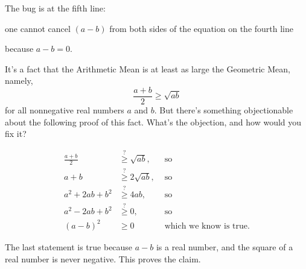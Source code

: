 \documentclass[handout]{mcs}
\begin{document}
\begin{problem}
\begin{solution}
The bug is at the fifth line:
\iffalse~(\ref{bug})\fi
one cannot cancel $(a-b)$ from
both sides of the equation on the fourth line
\iffalse~(\ref{cancel})\fi
because $a-b = 0$.
\end{solution}

\eparts
\end{problem}

\instatements{\newpage}

\begin{problem} It's a fact that the Arithmetic Mean is at least as
large the Geometric Mean, namely,
\[
\frac{a + b}{2} \geq \sqrt{a b}
\]
for all nonnegative real numbers $a$ and $b$.  But there's something
objectionable about the following proof of this fact.  What's the
objection, and how would you fix it?

\begin{bogusproof}
\begin{align*}
\frac{a + b}{2} & \stackrel{?}{\geq} \sqrt{a b}, & \text{ so} \\
a + b  & \stackrel{?}{\geq} 2 \sqrt{a b}, & \text{ so} \\
a^2 + 2 a b + b^2  & \stackrel{?}{\geq} 4 a b, & \text{ so}\\
a^2 - 2 a b + b^2  & \stackrel{?}{\geq} 0, & \text{ so}\\
(a - b)^2  & \geq 0 & \text{ which we know is true.}
\end{align*}

The last statement is true because $a - b$ is a real number, and the
square of a real number is never negative.  This proves the claim.
\end{bogusproof}
\end{problem}
\end{document}
